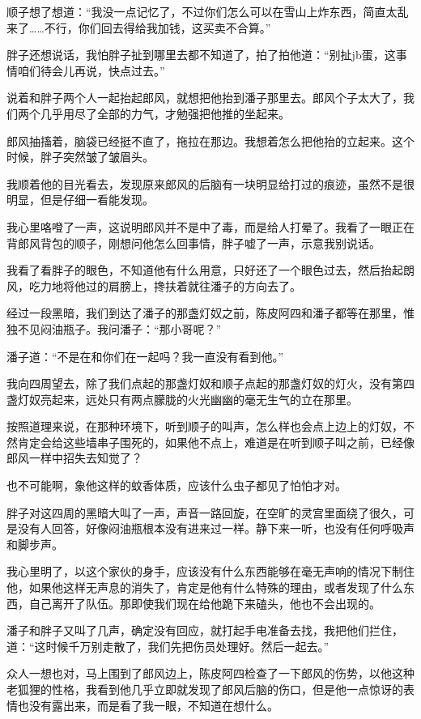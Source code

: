 顺子想了想道：“我没一点记忆了，不过你们怎么可以在雪山上炸东西，简直太乱来了……不行，你们回去得给我加钱，这买卖不合算。”

胖子还想说话，我怕胖子扯到哪里去都不知道了，拍了拍他道：“别扯jb蛋，这事情咱们待会儿再说，快点过去。”

说着和胖子两个人一起抬起郎风，就想把他抬到潘子那里去。郎风个子太大了，我们两个几乎用尽了全部的力气，才勉强把他推的坐起来。

郎风抽搐着，脑袋已经挺不直了，拖拉在那边。我想着怎么把他抬的立起来。这个时候，胖子突然皱了皱眉头。

我顺着他的目光看去，发现原来郎风的后脑有一块明显给打过的痕迹，虽然不是很明显，但是仔细一看能发现。

我心里咯噔了一声，这说明郎风并不是中了毒，而是给人打晕了。我看了一眼正在背郎风背包的顺子，刚想问他怎么回事情，胖子嘘了一声，示意我别说话。

我看了看胖子的眼色，不知道他有什么用意，只好还了一个眼色过去，然后抬起朗风，吃力地将他过的肩膀上，搀扶着就往潘子的方向去了。

经过一段黑暗，我们到达了潘子的那盏灯奴之前，陈皮阿四和潘子都等在那里，惟独不见闷油瓶子。我问潘子：“那小哥呢？”

潘子道：“不是在和你们在一起吗？我一直没有看到他。”

我向四周望去，除了我们点起的那盏灯奴和顺子点起的那盏灯奴的灯火，没有第四盏灯奴亮起来，远处只有两点朦胧的火光幽幽的毫无生气的立在那里。

按照道理来说，在那种环境下，听到顺子的叫声，怎么样也会点上边上的灯奴，不然肯定会给这些墙串子围死的，如果他不点上，难道是在听到顺子叫之前，已经像郎风一样中招失去知觉了？

也不可能啊，象他这样的蚊香体质，应该什么虫子都见了怕怕才对。

胖子对这四周的黑暗大叫了一声，声音一路回旋，在空旷的灵宫里面绕了很久，可是没有人回答，好像闷油瓶根本没有进来过一样。静下来一听，也没有任何呼吸声和脚步声。

我心里明了，以这个家伙的身手，应该没有什么东西能够在毫无声响的情况下制住他，如果他这样无声息的消失了，肯定是他有什么特殊的理由，或者发现了什么东西，自己离开了队伍。那即使我们现在给他跪下来磕头，他也不会出现的。

潘子和胖子又叫了几声，确定没有回应，就打起手电准备去找，我把他们拦住，道：“这时候千万别走散了，我们先把伤员处理好。然后一起去。”

众人一想也对，马上围到了郎风边上，陈皮阿四检查了一下郎风的伤势，以他这种老狐狸的性格，我看到他几乎立即就发现了郎风后脑的伤口，但是他一点惊讶的表情也没有露出来，而是看了我一眼，不知道在想什么。

